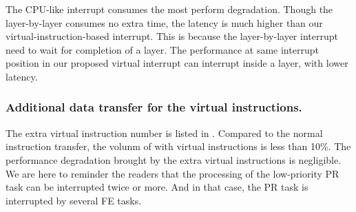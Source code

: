 
The CPU-like interrupt consumes the most perform degradation. Though the layer-by-layer consumes no extra time, the latency is much higher than our virtual-instruction-based interrupt. 
This is because the layer-by-layer interrupt need to wait for completion of a layer. The performance at same interrupt position in our proposed virtual interrupt can interrupt inside a layer, with lower latency.


\subsubsection{ Additional data transfer for the virtual instructions. }

The extra virtual instruction number is listed in . Compared to the normal instruction transfer, the volunm of with virtual instructions is less than 10\%. The performance degradation brought by the extra virtual instructions is negligible. 
We are here to reminder the readers that the processing of the low-priority PR task can be interrupted twice or more. And in that case, the PR task is interrupted by several FE tasks.



